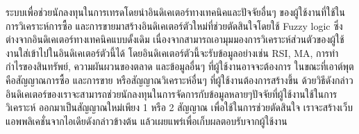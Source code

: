 \maketitle
\makesignature

\begin{abstractTH}
ระบบเพื่อช่วยนักลงทุนในการเทรดโดยนำอินดิเคเตอร์ทางเทคนิคและปัจจัยอื่นๆ ของผู้ใช้งานที่ใช้ในการวิเคราะห์การซื้อ และการขายมาสร้างอินดิเคเตอร์ตัวใหม่ที่ช่วยตัดสินใจโดยใช้ Fuzzy logic 
ซึ่งต่างจากอินดิเคเตอร์ทางเทคนิคแบบดั้งเดิม เนื่องจากสามารถเอามุมมองการวิเคราะห์ส่วนตัวของผู้ใช้งานใส่เข้าไปในอินดิเคเตอร์ตัวนี้ได้ โดยอินดิเคเตอร์ตัวนี้จะรับข้อมูลอย่างเช่น RSI, 
MA, การทำกำไรของสินทรัพย์, ความผันผวนของตลาด และข้อมูลอื่นๆ ที่ผู้ใช้งานอาจจะต้องการ ในขณะที่เอาต์พุตคือสัญญาณการซื้อ และการขาย หรือสัญญาณวิเคราะห์อื่นๆ 
ที่ผู้ใช้งานต้องการสร้างขึ้น ด้วยวิธีดังกล่าวอินดิเคเตอร์ของเราจะสามารถช่วยนักลงทุนในการจัดการกับข้อมูลหลายๆปัจจัยที่ผู้ใช้งานใช้ในการวิเคราะห์ ออกมาเป็นสัญญาณใหม่เพียง 1 หรือ 2 
สัญญาณ เพื่อใช้ในการช่วยตัดสินใจ เราจะสร้างเว็บแอพพลิเคชั่นจากไอเดียดังกล่าวข้างต้น แล้วเผยแพร่เพื่อเก็บผลตอบรับจากผู้ใช้งาน
\end{abstractTH}

\contentspage
\figurelistpage
\tablelistpage




